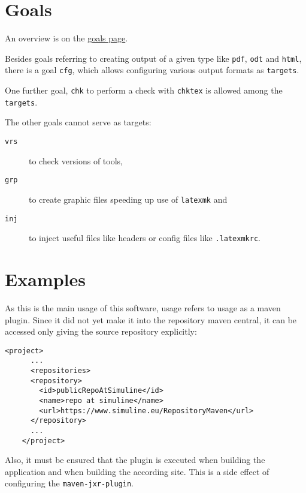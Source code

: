 \documentclass[a4paper,notumble,10pt,english]{leaflet}%
\begin{document}
  \newpage

  \section{Goals}

  An overview is on the 
  \href{http://simuline.eu/LatexMavenPlugin/plugin-info.html}{goals page}. 
  

  Besides goals referring to creating output of a given type 
  like \texttt{pdf}, \texttt{odt} and \texttt{html}, 
  there is a goal \texttt{cfg}, 
  which allows configuring various output formats as \texttt{targets}. %
  
  One further goal, \texttt{chk} to perform a check with \texttt{chktex} 
  is allowed among the \texttt{targets}. 

  The other goals cannot serve as targets: 
  \begin{description}
    \item[\texttt{vrs}] to check versions of tools, 
    \item[\texttt{grp}] to create graphic files speeding up use of \texttt{latexmk} 
    and 
    \item[\texttt{inj}] to inject useful files like headers or config files 
    like \texttt{.latexmkrc}. 
  \end{description}

  \newpage

  \section{Examples}

  As this is the main usage of this software, 
  usage refers to usage as a maven plugin. 
  Since it did not yet make it into the repository maven central, 
  it can be accessed only giving the source repository explicitly: 

  \begin{Verbatim}[fontsize=\scriptsize]
    <project>
      ...
      <repositories>
      <repository>
        <id>publicRepoAtSimuline</id>
        <name>repo at simuline</name>
        <url>https://www.simuline.eu/RepositoryMaven</url>
      </repository>
      ...
    </project>
  \end{Verbatim}

  Also, it must be ensured that the plugin is executed 
  when building the application and when building the according site. 
  This is a side effect of configuring the \texttt{maven-jxr-plugin}. 
\end{document}
